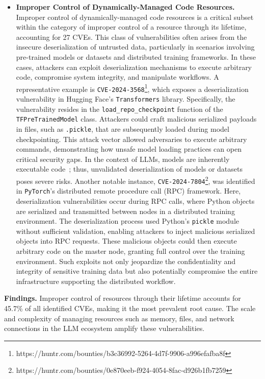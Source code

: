 \begin{itemize}[leftmargin=10pt]
    \item \textbf{Improper Control of Dynamically-Managed Code Resources.} Improper control of dynamically-managed code resources is a critical subset within the category of improper control of a resource through its lifetime, accounting for 27 CVEs. This class of vulnerabilities often arises from the insecure deserialization of untrusted data, particularly in scenarios involving pre-trained models or datasets and distributed training frameworks. In these cases, attackers can exploit deserialization mechanisms to execute arbitrary code, compromise system integrity, and manipulate workflows.
    A representative example is \texttt{CVE-2024-3568}\footnote{https://huntr.com/bounties/b3c36992-5264-4d7f-9906-a996efafba8f}, which exposes a deserialization vulnerability in Hugging Face’s \texttt{Transformers} library. Specifically, the vulnerability resides in the \texttt{load\_repo\_checkpoint} function of the \texttt{TFPreTrainedModel} class. Attackers could craft malicious serialized payloads in files, such as \texttt{.pickle}, that are subsequently loaded during model checkpointing. This attack vector allowed adversaries to execute arbitrary commands, demonstrating how unsafe model loading practices can open critical security gaps. In the context of LLMs, models are inherently executable code~\cite{zhao2024malhug,zhu2025tensorflow}; thus, unvalidated deserialization of models or datasets poses severe risks.
    Another notable instance, \texttt{CVE-2024-7804}\footnote{https://huntr.com/bounties/0e870eeb-f924-4054-8fac-d926b1fb7259}, was identified in \texttt{PyTorch}'s distributed remote procedure call (RPC) framework. Here, deserialization vulnerabilities occur during RPC calls, where Python objects are serialized and transmitted between nodes in a distributed training environment. The deserialization process used Python's \texttt{pickle} module without sufficient validation, enabling attackers to inject malicious serialized objects into RPC requests. These malicious objects could then execute arbitrary code on the master node, granting full control over the training environment. Such exploits not only jeopardize the confidentiality and integrity of sensitive training data but also potentially compromise the entire infrastructure supporting the distributed workflow.

\end{itemize}

\begin{tcolorbox}
    \textbf{Findings.} Improper control of resources through their lifetime accounts for 45.7\% of all identified CVEs, making it the most prevalent root cause. The scale and complexity of managing resources such as memory, files, and network connections in the LLM ecosystem amplify these vulnerabilities.
\end{tcolorbox}



